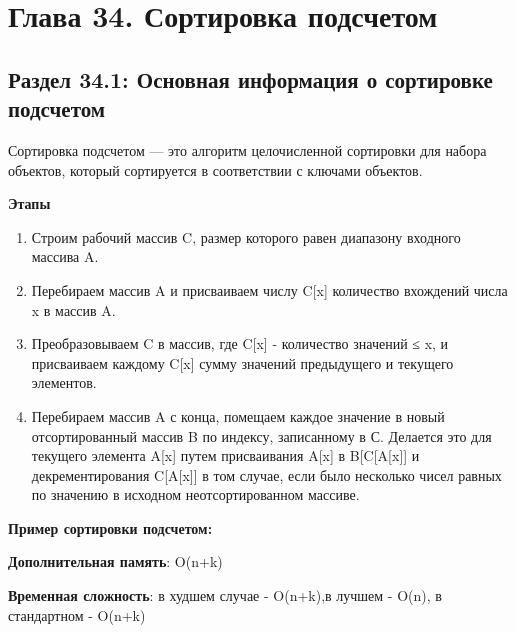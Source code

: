 
\chapter*{Глава 34. Сортировка подсчетом}
\section*{Раздел 34.1: Основная информация о сортировке подсчетом} 

\vspace{\baselineskip}
Сортировка подсчетом — это алгоритм целочисленной сортировки для набора
объектов, который сортируется в соответствии с ключами объектов.

\vspace{\baselineskip}
\textbf{Этапы}

\vspace{\baselineskip}

\begin{enumerate}
\item Строим рабочий массив C, размер которого равен диапазону входного массива A.
\item Перебираем массив A и присваиваем числу C[x] количество вхождений числа x в массив A.
\item Преобразовываем C в массив, где C[x] - количество значений ≤ x, и присваиваем каждому C[x] сумму значений предыдущего и текущего элементов.
\item Перебираем массив A с конца, помещаем каждое значение в новый отсортированный массив B по индексу, записанному в С. Делается это для текущего элемента A[x] путем присваивания A[x] в B[C[A[x]] и декрементирования C[A[x]] в том случае, если было несколько чисел равных по значению в исходном неотсортированном массиве.
\end{enumerate}

\vspace{\baselineskip}
\textbf{Пример сортировки подсчетом:}

\vspace{\baselineskip}

\vspace{\baselineskip}
\textbf{Дополнительная память}: O(n+k)

\vspace{\baselineskip}
\textbf{Временная сложность}: в худшем случае - O(n+k),в лучшем - O(n), в стандартном - O(n+k)

\vspace{\baselineskip}
